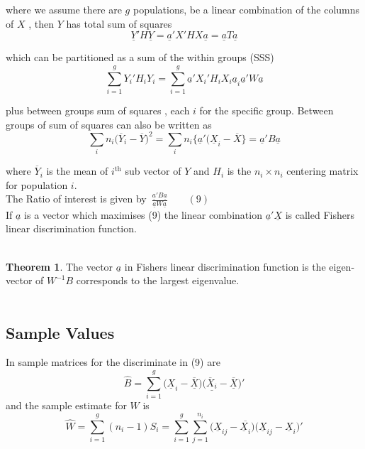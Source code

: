 \documentclass[11pt,a4paper]{article}
\theoremstyle{definition}
\newtheorem{thm}{Theorem}[section]
\begin{document}
where we assume there are $g$ populations, be a linear combination of the columns of $X$ , then $Y$ has total sum of squares \begin{equation}\tag{6}
\underline{Y}'H\underline{Y}=\underline{a}'X'HX\underline{a}= \underline{a}T\underline{a}
\end{equation}


which can be partitioned as a sum of the within groups (SSS) \begin{equation}\tag{7}
\sum^g_{i=1}Y_i'H_iY_i = \sum^g_{i=1}\underline{a}'X_i'H_iX_i\underline{a}_i \underline{a}'W\underline{a}
\end{equation}

plus between groups sum of squares , each $i$ for the specific group. Between groups of sum of squares can also be written as \begin{equation}\tag{8}
\sum_in_i\big(\overline{Y}_i-\overline{Y}\big)^2= \sum_i n_i\big\{\underline{a}'\big(\underline{X}_i-\overline{X}\big\} = \underline{a}'B\underline{a}
\end{equation}


where $\overline{Y}_i$ is the mean of $i^{\text{th}}$ sub vector of $Y$ and $H_i$ is the $n_i\times n_i$ centering matrix for population  $i$.\\


The Ratio of interest is given by \,$\displaystyle{\frac{\underline{a}'B\underline{a}}{\underline{a}W\underline{a}}\qquad (9)}$\\

If $\underline{a}$ is a vector which maximises (9) the linear combination $\underline{a}'\underline{X}$ is called Fishers linear discrimination function.\\\\




\begin{thm}
The vector $\underline{a}$ in Fishers linear discrimination function is the eigen-vector of $W^{-1}B$ corresponds to the largest eigenvalue.\\\\
\end{thm}




\subsection{Sample Values}
In sample matrices for the discriminate in (9) are \begin{equation}\tag{10}
\widehat{B} = \sum^g_{i=1}\big(\underline{X}_i-\overline{\underline{X}}\big)\big(\underline{\overline{X}_i}-\overline{\underline{X}}\big)'
\end{equation}
and the sample estimate for $W$ is 
\begin{equation}\tag{11}
\widehat{W} = \sum^g_{i=1}(n_i-1)S_i = \sum^g_{i=1}\sum^{n_i}_{j=1}\big(\underline{X}_{ij}-\overline{\underline{X}_i}\big)\big(\underline{X}_{ij}-\underline{X}_i\big)'
\end{equation}
\end{document}
